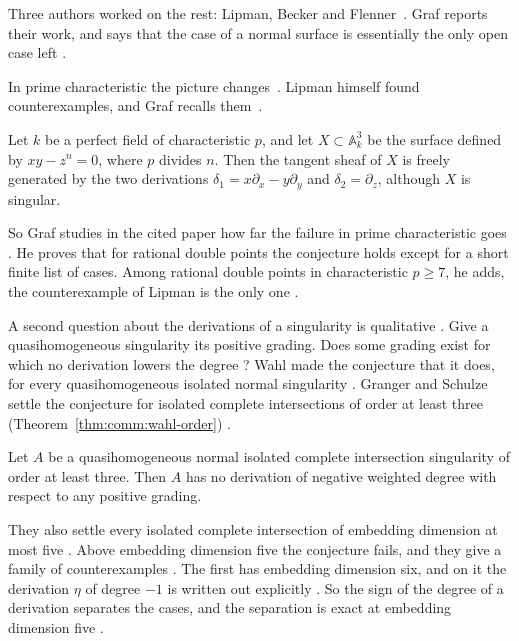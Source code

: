 Three authors worked on the rest: Lipman, Becker and
Flenner~\cite[p.~115]{Graf2022LZPosChar}. Graf reports their work, and says
that the case of a normal surface is essentially the only open case left
\cite[p.~115]{Graf2022LZPosChar}.

In prime characteristic the picture changes~\cite[p.~115]{Graf2022LZPosChar}.
Lipman himself found counterexamples, and Graf recalls
them~\cite[p.~116]{Graf2022LZPosChar}.

\begin{example}\label{ex:comm:lipman}
Let $k$ be a perfect field of characteristic $p$, and let
$X\subset\mathbb{A}^3_k$ be the surface defined by $xy - z^n = 0$, where $p$
divides $n$. Then the tangent sheaf of $X$ is freely generated by the two
derivations $\delta_1 = x\partial_x - y\partial_y$ and
$\delta_2 = \partial_z$, although $X$ is singular.
\end{example}

So Graf studies in the cited paper how far the failure in prime characteristic
goes \cite[p.~115]{Graf2022LZPosChar}. He proves that for rational double
points the conjecture holds except for a short finite list of cases. Among
rational double points in characteristic $p \ge 7$, he adds, the
counterexample of Lipman is the only one \cite[p.~115]{Graf2022LZPosChar}.

A second question about the derivations of a singularity is qualitative
\cite[p.~1]{GrangerSchulze2014Negative}. Give a quasihomogeneous singularity
its positive grading. Does some grading exist for which no derivation lowers
the degree \cite[p.~1]{GrangerSchulze2014Negative}? Wahl made the conjecture
that it does, for every quasihomogeneous isolated normal singularity
\cite[Conjecture, p.~2]{GrangerSchulze2014Negative}. Granger and Schulze
settle the conjecture for isolated complete intersections of order at least
three (Theorem~\ref{thm:comm:wahl-order}) \cite[Theorem~1.1,
p.~2]{GrangerSchulze2014Negative}.

\begin{theorem}\label{thm:comm:wahl-order}
Let $A$ be a quasihomogeneous normal isolated complete intersection
singularity of order at least three. Then $A$ has no derivation of negative
weighted degree with respect to any positive grading.
\end{theorem}

They also settle every isolated complete intersection of embedding dimension
at most five \cite[Theorem~1.3, p.~2]{GrangerSchulze2014Negative}. Above
embedding dimension five the conjecture fails, and they give a family of
counterexamples \cite[Example~1.2, pp.~1--2]{GrangerSchulze2014Negative}. The
first has embedding dimension six, and on it the derivation $\eta$ of degree
$-1$ is written out explicitly \cite[Example~1.2,
p.~2]{GrangerSchulze2014Negative}. So the sign of the degree of a derivation
separates the cases, and the separation is exact at embedding dimension five
\cite[Theorem~1.3, p.~2]{GrangerSchulze2014Negative}.

